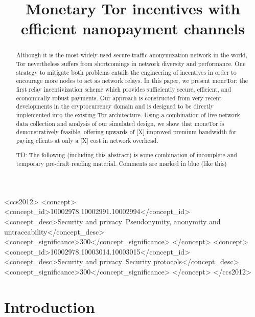 \documentclass[sigconf, anonymous]{acmart}
\newcommand{\td}[1]{ {\color{blue} TD: #1}}
\begin{document}
\title{Monetary Tor incentives with efficient nanopayment channels} %

\begin{abstract}

  Although it is the most widely-used secure traffic anonymization network in
  the world, Tor nevertheless suffers from shortcomings in network diversity and
  performance. One strategy to mitigate both problems entails the engineering of
  incentives in order to encourage more nodes to act as network relays. In this
  paper, we present moneTor: the first relay incentivization scheme which
  provides sufficiently secure, efficient, and economically robust payments. Our
  approach is constructed from very recent developments in the cryptocurrency
  domain and is designed to be directly implemented into the existing Tor
  architecture. Using a combination of live network data collection and analysis
  of our simulated design, we show that moneTor is demonstratively feasible,
  offering upwards of [X] improved premium bandwidth for paying clients at only
  a [X] cost in network overhead.

  \td{The following (including this abstract) is some combination of incomplete
    and temporary pre-draft reading material. Comments are marked in blue (like this)}

\end{abstract}

\begin{CCSXML}
<ccs2012>
<concept>
<concept_id>10002978.10002991.10002994</concept_id>
<concept_desc>Security and privacy~Pseudonymity, anonymity and untraceability</concept_desc>
<concept_significance>300</concept_significance>
</concept>
<concept>
<concept_id>10002978.10003014.10003015</concept_id>
<concept_desc>Security and privacy~Security protocols</concept_desc>
<concept_significance>300</concept_significance>
</concept>
</ccs2012>
\end{CCSXML}



\maketitle

\section{Introduction}
\label{sec:introduction}

\end{document}
